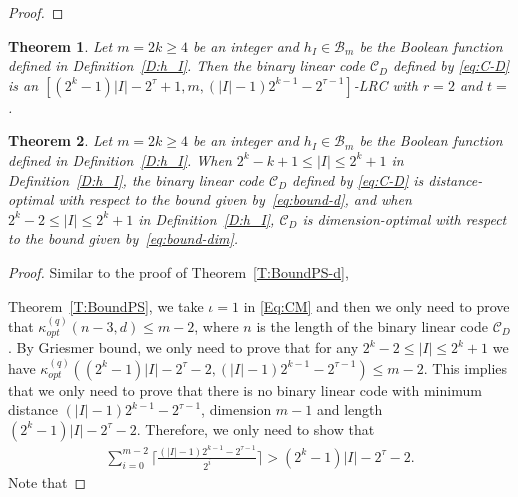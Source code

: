 \documentclass[10pt]{article}
\newtheorem{theorem}{Theorem}
\newcommand{\0}{\textbf{0}}
\newcommand{\1}{\textbf{1}}
\newcommand{\C}{{\mathcal C}}
\newcommand{\CardI}{\left|I\right|}
\begin{document}
{{\begin{proof}
\end{proof}
}












\begin{theorem}\label{T:PSVParameter}
Let $m=2k\geq 4$ be an integer and $h_I\in\mathcal{B}_m$ be the Boolean function defined in Definition~\ref{D:h_I}.
Then the binary linear code $\C_{D}$ defined by \eqref{eq:C-D}
is an $[(2^k-1)\CardI-2^{\tau}+1, m, (\CardI-1)2^{k-1}-2^{\tau-1}]$-LRC with $r=2$ and $t=$.
\end{theorem}

\begin{theorem}\label{T:BoundPSI}
Let $m=2k\geq 4$ be an integer and $h_I\in\mathcal{B}_m$ be the Boolean function defined in Definition~\ref{D:h_I}.
When $2^k-k+1\leq \CardI \leq 2^k+1$ in Definition~\ref{D:h_I}, the binary linear code $\C_{D}$ defined by \eqref{eq:C-D} is distance-optimal with respect to the bound given by~\eqref{eq:bound-d},
and when $2^k-2\leq \CardI \leq 2^k+1$ in Definition~\ref{D:h_I},  $\C_{D}$  is dimension-optimal with respect to the bound given by~\eqref{eq:bound-dim}.
\end{theorem}

\begin{proof}
Similar to the proof of Theorem~\ref{T:BoundPS-d},


 Theorem~\ref{T:BoundPS}, we take $\iota=1$ in \eqref{Eq:CM} and then we only need to prove that
$\kappa_{o p t}^{(q)}(n-3, d)\leq m-2$, where $n$ is the length of the binary linear code $\C_{D}$.
By Griesmer bound, we only need to prove that for any $2^k-2\leq  \CardI\leq 2^k+1$ we have $\kappa_{o p t}^{(q)}((2^k-1)\CardI-2^\tau-2, (\CardI-1)2^{k-1}-2^{\tau-1})\leq m-2$.
This implies that we only need to prove that there is no binary linear code
with minimum distance  $(\CardI-1)2^{k-1}-2^{\tau-1}$, dimension $m-1$ and length $(2^k-1)\CardI-2^\tau-2$.
Therefore, we only need to show that
\begin{eqnarray*}\label{Eq:PSoptimal}
\sum_{i=0}^{m-2}\bigg\lceil\frac{(\CardI-1)2^{k-1}-2^{\tau-1}}{2^i}\bigg\rceil >(2^k-1)\CardI-2^\tau-2.
\end{eqnarray*}
Note that














\end{proof}}
\end{document}
